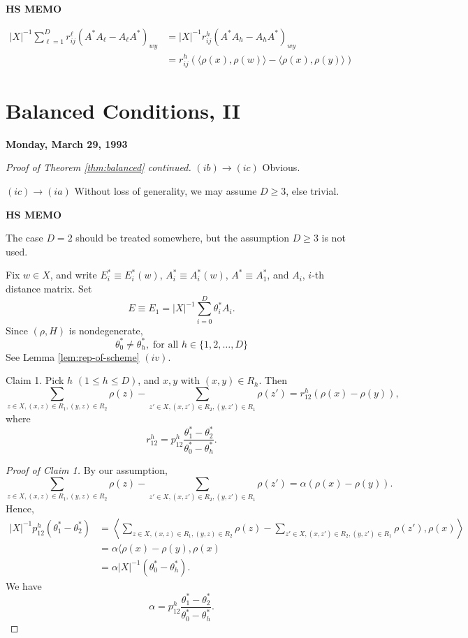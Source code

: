 \documentclass[
]{book}
\theoremstyle{definition}
\theoremstyle{definition}
\theoremstyle{definition}
\theoremstyle{definition}
\theoremstyle{remark}
\begin{document}
\textbf{HS MEMO}

\begin{align}
|X|^{-1}\sum_{\ell=1}^D r^\ell_{ij}(A^*A_\ell - A_\ell A^*)_{wy} & = |X|^{-1}r^h_{ij}(A^*A_h- A_hA^*)_{wy}\\
& = r^h_{ij}(\langle \rho(x),\rho(w)\rangle - \langle \rho(x),\rho(y)\rangle)
\end{align}

\hypertarget{lec25}{%
\chapter{Balanced Conditions, II}\label{lec25}}

\textbf{Monday, March 29, 1993}

\begin{proof}[Proof of Theorem \ref{thm:balanced} continued]
\leavevmode

\((ib)\to(ic)\) Obvious.

\((ic)\to(ia)\) Without loss of generality, we may assume \(D\geq 3\), else trivial.

\textbf{HS MEMO}

The case \(D = 2\) should be treated somewhere, but the assumption \(D\geq 3\) is not used.

Fix \(w\in X\), and write \(E^*_i \equiv E^*_i(w)\), \(A^*_i\equiv A^*_i(w)\), \(A^*\equiv A^*_1\), and \(A_i\), \(i\)-th distance matrix. Set
\[E \equiv E_1 = |X|^{-1}\sum_{i=0}^D \theta^*_i A_i.\]
Since \((\rho, H)\) is nondegenerate,
\[\theta^*_0 \neq \theta^*_h, \; \text{for all }h\in \{1,2,\ldots, D\}\]
See Lemma \ref{lem:rep-of-scheme} \((iv)\).

Claim 1. Pick \(h\) \((1\leq h\leq D)\), and \(x,y\) with \((x,y)\in R_h\). Then
\[\sum_{z\in X, (x,z)\in R_1, (y,z)\in R_2}\rho(z) - \sum_{z'\in X, (x,z')\in R_2, (y,z')\in R_1}\rho(z') = r^h_{12}(\rho(x)-\rho(y)),\]
where
\[r^h_{12} = p^h_{12}\frac{\theta_1^* - \theta^*_2}{\theta^*_0-\theta^*_h}.\]

\emph{Proof of Claim 1.}
By our assumption,
\[\sum_{z\in X, (x,z)\in R_1, (y,z)\in R_2}\rho(z) - \sum_{z'\in X, (x,z')\in R_2, (y,z')\in R_1}\rho(z') = \alpha(\rho(x)-\rho(y)).\]
Hence,
\begin{align}
|X|^{-1}p^h_{12}(\theta^*_1-\theta^*_2) & = \left\langle \sum_{z\in X, (x,z)\in R_1, (y,z)\in R_2}\rho(z) - \sum_{z'\in X, (x,z')\in R_2, (y,z')\in R_1}\rho(z'), \rho(x)\right\rangle \\
& = \alpha\langle \rho(x)-\rho(y), \rho(x)\\
& = \alpha |X|^{-1}(\theta_0^*-\theta^*_h).
\end{align}
We have
\[\alpha = p^h_{12}\frac{\theta_1^* - \theta^*_2}{\theta^*_0-\theta^*_h}.\]


\end{proof}
\end{document}
